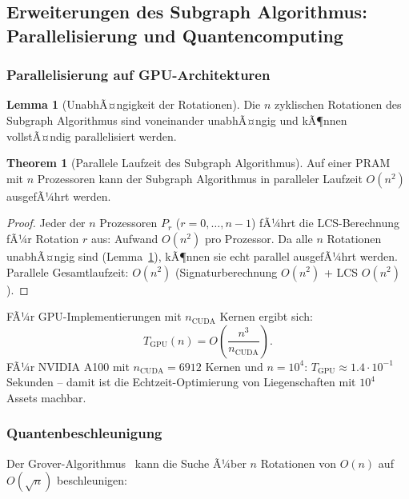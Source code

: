 ﻿\documentclass[a4paper,12pt]{article}
\theoremstyle{definition}
\newtheorem{lemma}{Lemma}[section]
\newtheorem{theorem}{Theorem}[section]
\begin{document}
\subsection{Erweiterungen des Subgraph Algorithmus: Parallelisierung und Quantencomputing}

\subsubsection{Parallelisierung auf GPU-Architekturen}

\begin{lemma}[UnabhÃ¤ngigkeit der Rotationen]
\label{lem:unabhaengigkeit}
Die $n$ zyklischen Rotationen des Subgraph Algorithmus sind voneinander unabhÃ¤ngig
und kÃ¶nnen vollstÃ¤ndig parallelisiert werden.
\end{lemma}

\begin{theorem}[Parallele Laufzeit des Subgraph Algorithmus]
\label{thm:parallel}
Auf einer PRAM mit $n$ Prozessoren kann der Subgraph Algorithmus in
paralleler Laufzeit $O(n^2)$ ausgefÃ¼hrt werden.
\end{theorem}

\begin{proof}
Jeder der $n$ Prozessoren $P_r$ ($r = 0, \ldots, n-1$) fÃ¼hrt die LCS-Berechnung
fÃ¼r Rotation $r$ aus: Aufwand $O(n^2)$ pro Prozessor.
Da alle $n$ Rotationen unabhÃ¤ngig sind (Lemma~\ref{lem:unabhaengigkeit}),
kÃ¶nnen sie echt parallel ausgefÃ¼hrt werden.
Parallele Gesamtlaufzeit: $O(n^2)$ (Signaturberechnung $O(n^2)$ + LCS $O(n^2)$).
\end{proof}

FÃ¼r GPU-Implementierungen mit $n_{\mathrm{CUDA}}$ Kernen ergibt sich:
\[
    T_{\mathrm{GPU}}(n) = O\!\left(\frac{n^3}{n_{\mathrm{CUDA}}}\right).
\]
FÃ¼r NVIDIA A100 mit $n_{\mathrm{CUDA}} = 6912$ Kernen und $n = 10^4$:
$T_{\mathrm{GPU}} \approx 1.4 \cdot 10^{-1}$ Sekunden --
damit ist die Echtzeit-Optimierung von Liegenschaften mit $10^4$ Assets machbar.

\subsubsection{Quantenbeschleunigung}

Der Grover-Algorithmus~\cite{grover1996} kann die Suche Ã¼ber $n$ Rotationen
von $O(n)$ auf $O(\sqrt{n})$ beschleunigen:
\end{document}
